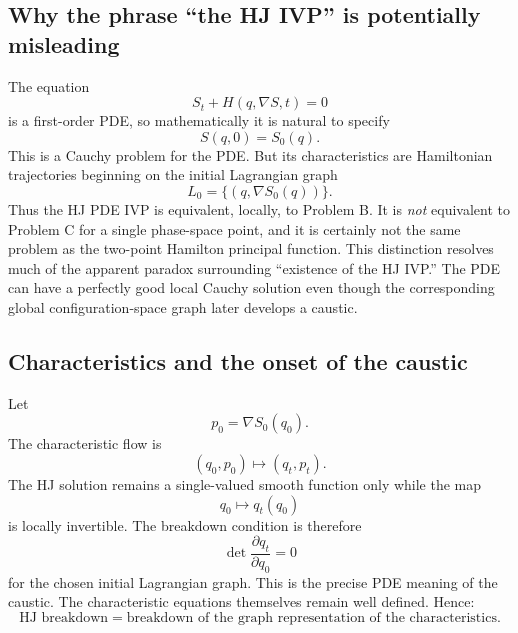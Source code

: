 \subsection{Why the phrase ``the HJ IVP'' is potentially misleading}
The equation
\begin{equation}
S_t+H(q,\nabla S,t)=0
\end{equation}
is a first-order PDE, so mathematically it is natural to specify
\begin{equation}
S(q,0)=S_0(q).
\end{equation}
This is a Cauchy problem for the PDE.
But its characteristics are Hamiltonian trajectories beginning on the
initial Lagrangian graph
\begin{equation}
L_0=\{(q,\nabla S_0(q))\}.
\end{equation}
Thus the HJ PDE IVP is equivalent, locally, to Problem B.
It is \emph{not} equivalent to Problem C for a single phase-space point, and
it is certainly not the same problem as the two-point Hamilton principal
function.
This distinction resolves much of the apparent paradox surrounding
``existence of the HJ IVP.''
The PDE can have a perfectly good local Cauchy solution even though the
corresponding global configuration-space graph later develops a caustic.
\subsection{Characteristics and the onset of the caustic}
Let
\begin{equation}
p_0=\nabla S_0(q_0).
\end{equation}
The characteristic flow is
\begin{equation}
(q_0,p_0)
\longmapsto
(q_t,p_t).
\end{equation}
The HJ solution remains a single-valued smooth function only while the map
\begin{equation}
q_0\longmapsto q_t(q_0)
\end{equation}
is locally invertible.
The breakdown condition is therefore
\begin{equation}
\det
\frac{\partial q_t}{\partial q_0}
=0
\end{equation}
for the chosen initial Lagrangian graph.
This is the precise PDE meaning of the caustic.
The characteristic equations themselves remain well defined.
Hence:
\begin{equation}
\boxed{
\text{HJ breakdown}
=
\text{breakdown of the graph representation of the characteristics}.
}
\end{equation}
